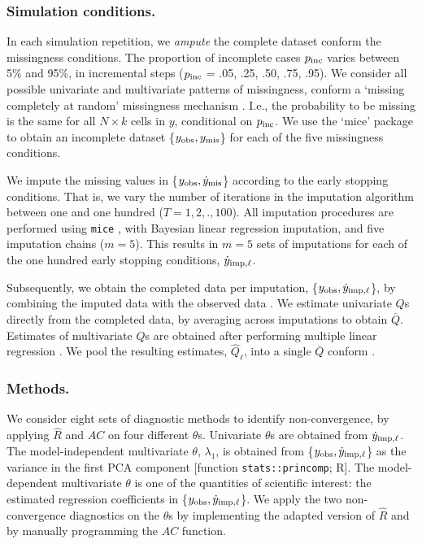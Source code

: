\documentclass[Royal,times,sageh]{sagej}
\begin{document}
\hypertarget{simulation-conditions.}{%
\subsubsection{Simulation conditions.}\label{simulation-conditions.}}

In each simulation repetition, we \emph{ampute} the complete dataset conform the missingness conditions. The proportion of incomplete cases \(p_{\rm inc}\) varies between 5\% and 95\%, in incremental steps (\(p_{\rm inc}\) = .05, .25, .50, .75, .95). We consider all possible univariate and multivariate patterns of missingness, conform a `missing completely at random' missingness mechanism \citep[MCAR;][]{rubin87}. I.e., the probability to be missing is the same for all \(N \times k\) cells in \(y\), conditional on \(p_{\rm inc}\). We use the `mice' package \citep[function \texttt{mice::ampute()};][]{mice} to obtain an incomplete dataset \{\(y_{\rm obs}, y_{\rm mis}\)\} for each of the five missingness conditions.

We impute the missing values in \{\(y_{\rm obs}, \dot y_{\rm mis}\)\} according to the early stopping conditions. That is, we vary the number of iterations in the imputation algorithm between one and one hundred (\(T = 1,2,.,100\)). All imputation procedures are performed using \texttt{mice} \citep[function \texttt{mice()};][]{mice}, with Bayesian linear regression imputation, and five imputation chains (\(m=5\)). This results in \(m=5\) sets of imputations for each of the one hundred early stopping conditions, \(\dot y_{\rm imp, \ell}\).

Subsequently, we obtain the completed data per imputation, \{\(y_{\rm obs}, \dot y_{\rm imp, \ell}\)\}, by combining the imputed data with the observed data \citep[function \texttt{mice::complete()};][]{mice}. We estimate univariate \(Q\)s directly from the completed data, by averaging across imputations to obtain \(\bar{Q}\). Estimates of multivariate \(Q\)s are obtained after performing multiple linear regression \citep[function \texttt{stats::lm()},][]{R}. We pool the resulting estimates, \(\hat{Q}_\ell\), into a single \(\bar{Q}\) conform \citet{vink14}.

\hypertarget{methods.}{%
\subsubsection{Methods.}\label{methods.}}

We consider eight sets of diagnostic methods to identify non-convergence, by applying \(\widehat{R}\) and \(AC\) on four different \(\theta\)s. Univariate \(\theta\)s are obtained from \(\dot y_{\rm imp, \ell}\). The model-independent multivariate \(\theta\), \(\lambda_{1}\), is obtained from \{\(y_{\rm obs}, \dot y_{\rm imp, \ell}\)\} as the variance in the first PCA component {[}function \texttt{stats::princomp}; R{]}. The model-dependent multivariate \(\theta\) is one of the quantities of scientific interest: the estimated regression coefficients in \{\(y_{\rm obs}, \dot y_{\rm imp, \ell}\)\}. We apply the two non-convergence diagnostics on the \(\theta\)s by implementing the adapted version of \(\widehat{R}\) and by manually programming the \(AC\) function.
\end{document}
